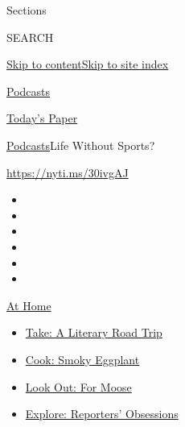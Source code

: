 Sections

SEARCH

\protect\hyperlink{site-content}{Skip to
content}\protect\hyperlink{site-index}{Skip to site index}

\href{https://www.nytimes3xbfgragh.onion/spotlight/podcasts}{Podcasts}

\href{https://myaccount.nytimes3xbfgragh.onion/auth/login?response_type=cookie\&client_id=vi}{}

\href{https://www.nytimes3xbfgragh.onion/section/todayspaper}{Today's
Paper}

\href{/spotlight/podcasts}{Podcasts}\textbar{}Life Without Sports?

\url{https://nyti.ms/30ivgAJ}

\begin{itemize}
\item
\item
\item
\item
\item
\item
\end{itemize}

\href{https://www.nytimes3xbfgragh.onion/spotlight/at-home?action=click\&pgtype=Article\&state=default\&region=TOP_BANNER\&context=at_home_menu}{At
Home}

\begin{itemize}
\tightlist
\item
  \href{https://www.nytimes3xbfgragh.onion/2020/07/28/books/time-for-a-literary-road-trip.html?action=click\&pgtype=Article\&state=default\&region=TOP_BANNER\&context=at_home_menu}{Take:
  A Literary Road Trip}
\item
  \href{https://www.nytimes3xbfgragh.onion/2020/07/29/magazine/bored-with-your-home-cooking-some-smoky-eggplant-will-fix-that.html?action=click\&pgtype=Article\&state=default\&region=TOP_BANNER\&context=at_home_menu}{Cook:
  Smoky Eggplant}
\item
  \href{https://www.nytimes3xbfgragh.onion/2020/07/27/travel/moose-michigan-isle-royale.html?action=click\&pgtype=Article\&state=default\&region=TOP_BANNER\&context=at_home_menu}{Look
  Out: For Moose}
\item
  \href{https://www.nytimes3xbfgragh.onion/interactive/2020/at-home/even-more-reporters-editors-diaries-lists-recommendations.html?action=click\&pgtype=Article\&state=default\&region=TOP_BANNER\&context=at_home_menu}{Explore:
  Reporters' Obsessions}
\end{itemize}

